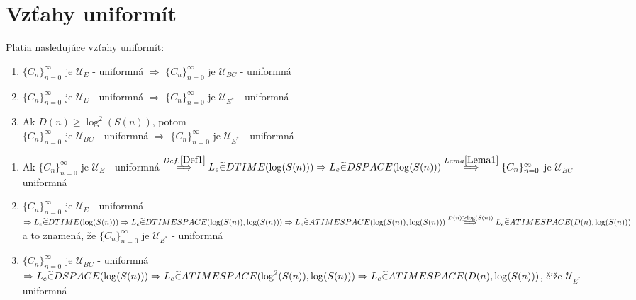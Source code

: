 \section{Vzťahy uniformít}

\begin{veta}
  Platia nasledujúce vzťahy uniformít:
  \begin{enumerate}
    \item $\{C_n\}_{n=0}^{\infty}$ je $\mathcal{U}_E$ - uniformná $\Rightarrow$
      $\{C_n\}_{n=0}^{\infty}$ je $\mathcal{U}_{BC}$ - uniformná
    \item $\{C_n\}_{n=0}^{\infty}$ je $\mathcal{U}_E$ - uniformná $\Rightarrow$
      $\{C_n\}_{n=0}^{\infty}$ je $\mathcal{U}_{E^*}$ - uniformná
    \item Ak $D(n)\geq \log^2(S(n))$, potom \\ $\{C_n\}_{n=0}^{\infty}$ je
      $\mathcal{U}_{BC}$ - uniformná $\Rightarrow$ $\{C_n\}_{n=0}^{\infty}$ je
      $\mathcal{U}_{E^*}$ - uniformná
  \end{enumerate}
\end{veta}

\begin{dokaz}
  \begin{enumerate}
  \item Ak $\{C_n\}_{n=0}^{\infty}$ je $\mathcal{U}_E$ - uniformná
    $\overset{Def.\ref{Def1}}{\Longrightarrow} L_e \widetilde{\in} DTIME(\log(S(n)))
    \Rightarrow\\ L_e \widetilde{\in} DSPACE(\log(S(n)))
    \overset{Lema\ref{Lema1}}{\Longrightarrow}\{C_n\}_{n=0}^{\infty}$ je $\mathcal{U}_{BC}$ -
    uniformná
  \item $\{C_n\}_{n=0}^{\infty}$ je $\mathcal{U}_E$ - uniformná $\Rightarrow L_e
    \widetilde{\in} DTIME(\log(S(n))) \Rightarrow\\ L_e \widetilde{\in}
    DTIMESPACE(\log(S(n)),\log(S(n))) \Rightarrow\\ L_e \widetilde{\in}
    ATIMESPACE(\log(S(n)),\log(S(n))) \overset{D(n)\geq \log(S(n))}{\Longrightarrow}\\ L_e
    \widetilde{\in} ATIMESPACE(D(n),\log(S(n)))$ a to znamená, že $\{C_n\}_{n=0}^{\infty}$ je
    $\mathcal{U}_{E^*}$ - uniformná
  \item $\{C_n\}_{n=0}^{\infty}$ je $\mathcal{U}_{BC}$ - uniformná $\Rightarrow L_e
    \widetilde{\in} DSPACE(\log(S(n))) \Rightarrow\\ L_e \widetilde{\in}
    ATIMESPACE(\log^2(S(n)),\log(S(n))) \Rightarrow\\ L_e \widetilde{\in}
    ATIMESPACE(D(n),\log(S(n)))$, čiže $\mathcal{U}_{E^*}$ - uniformná
  \end{enumerate}
\end{dokaz}

